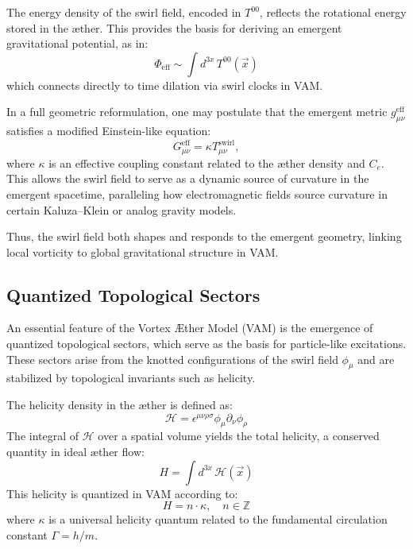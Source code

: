         The energy density of the swirl field, encoded in $T^{00}$, reflects the rotational energy stored in the æther. This provides the basis for deriving an emergent gravitational potential, as in:
        \begin{equation}
            \Phi_{\text{eff}} \sim \int d^{3x} \, T^{00}(\vec{x})
        \end{equation}
        which connects directly to time dilation via swirl clocks in VAM.

        In a full geometric reformulation, one may postulate that the emergent metric $g^{\text{eff}}_{\mu\nu}$ satisfies a modified Einstein-like equation:
        \begin{equation}
            G_{\mu\nu}^{\text{eff}} = \kappa T_{\mu\nu}^{\text{swirl}},
        \end{equation}
        where $\kappa$ is an effective coupling constant related to the æther density and $C_e$. This allows the swirl field to serve as a dynamic source of curvature in the emergent spacetime, paralleling how electromagnetic fields source curvature in certain Kaluza--Klein or analog gravity models.

        Thus, the swirl field both shapes and responds to the emergent geometry, linking local vorticity to global gravitational structure in VAM.


        \subsection{Quantized Topological Sectors}
        An essential feature of the Vortex Æther Model (VAM) is the emergence of quantized topological sectors, which serve as the basis for particle-like excitations. These sectors arise from the knotted configurations of the swirl field $\phi_\mu$ and are stabilized by topological invariants such as helicity.

        The helicity density in the æther is defined as:
        \begin{equation}
            \mathcal{H} = \epsilon^{\mu\nu\rho\sigma} \phi_\mu \partial_\nu \phi_\rho
        \end{equation}
        The integral of $\mathcal{H}$ over a spatial volume yields the total helicity, a conserved quantity in ideal æther flow:
        \begin{equation}
            H = \int d^{3x} \, \mathcal{H}(\vec{x})
        \end{equation}
        This helicity is quantized in VAM according to:
        \begin{equation}
            H = n \cdot \kappa, \quad n \in \mathbb{Z}
        \end{equation}
        where $\kappa$ is a universal helicity quantum related to the fundamental circulation constant $\Gamma = h/m$.

